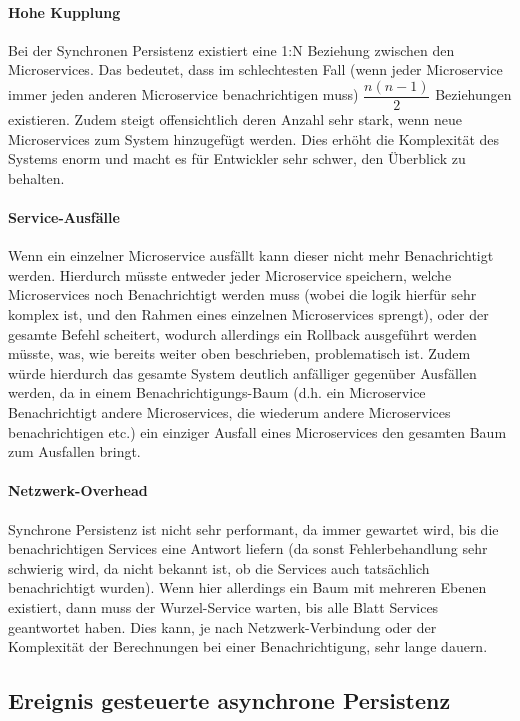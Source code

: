 \paragraph{Hohe Kupplung}
Bei der Synchronen Persistenz existiert eine 1:N Beziehung zwischen den Microservices. Das bedeutet, dass im schlechtesten Fall (wenn jeder Microservice immer jeden anderen Microservice benachrichtigen muss) $\dfrac{n(n-1)}{2}$
Beziehungen existieren. Zudem steigt offensichtlich deren Anzahl sehr stark, wenn neue Microservices zum System hinzugefügt werden. Dies erhöht die Komplexität des Systems enorm und macht es für Entwickler sehr schwer, den Überblick zu behalten.

\paragraph{Service-Ausfälle}
Wenn ein einzelner Microservice ausfällt kann dieser nicht mehr Benachrichtigt werden. Hierdurch müsste entweder jeder Microservice speichern, welche Microservices noch Benachrichtigt werden muss (wobei die logik hierfür sehr komplex ist, und den Rahmen eines einzelnen Microservices sprengt), oder der gesamte Befehl scheitert, wodurch allerdings ein Rollback ausgeführt werden müsste, was, wie bereits weiter oben beschrieben, problematisch ist. Zudem würde hierdurch das gesamte System deutlich anfälliger gegenüber Ausfällen werden, da in einem Benachrichtigungs-Baum (d.h. ein Microservice Benachrichtigt andere Microservices, die wiederum andere Microservices benachrichtigen etc.) ein einziger Ausfall eines Microservices den gesamten Baum zum Ausfallen bringt.

\paragraph{Netzwerk-Overhead}
Synchrone Persistenz ist nicht sehr performant, da immer gewartet wird, bis die benachrichtigen Services eine Antwort liefern (da sonst Fehlerbehandlung sehr schwierig wird, da nicht bekannt ist, ob die Services auch tatsächlich benachrichtigt wurden). Wenn hier allerdings ein Baum mit mehreren Ebenen existiert, dann muss der Wurzel-Service warten, bis alle Blatt Services geantwortet haben. Dies kann, je nach Netzwerk-Verbindung oder der Komplexität der Berechnungen bei einer Benachrichtigung, sehr lange dauern.

\subsection{Ereignis gesteuerte asynchrone Persistenz}

